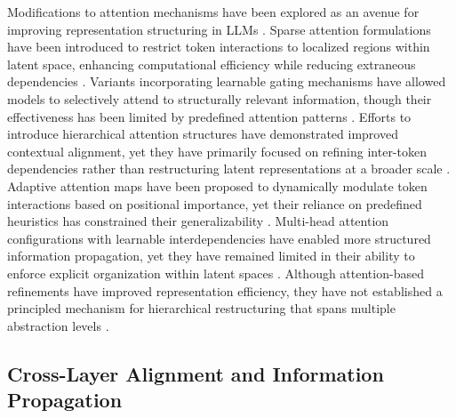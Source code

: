 \documentclass[5p,times]{elsarticle}
\begin{document}
Modifications to attention mechanisms have been explored as an avenue for improving representation structuring in LLMs \cite{nijodo2024automated}. Sparse attention formulations have been introduced to restrict token interactions to localized regions within latent space, enhancing computational efficiency while reducing extraneous dependencies \cite{ga2024evaluating}. Variants incorporating learnable gating mechanisms have allowed models to selectively attend to structurally relevant information, though their effectiveness has been limited by predefined attention patterns \cite{ blackwood2024implementation}. Efforts to introduce hierarchical attention structures have demonstrated improved contextual alignment, yet they have primarily focused on refining inter-token dependencies rather than restructuring latent representations at a broader scale \cite{arsal2024emerging, embury2024dynamic}. Adaptive attention maps have been proposed to dynamically modulate token interactions based on positional importance, yet their reliance on predefined heuristics has constrained their generalizability \cite{nishikado2024mitigating}. Multi-head attention configurations with learnable interdependencies have enabled more structured information propagation, yet they have remained limited in their ability to enforce explicit organization within latent spaces \cite{anderson2024semantic}. Although attention-based refinements have improved representation efficiency, they have not established a principled mechanism for hierarchical restructuring that spans multiple abstraction levels \cite{vitiello2024context}.

\subsection{Cross-Layer Alignment and Information Propagation}
\end{document}

